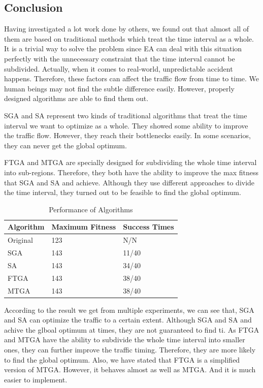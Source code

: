 \documentclass{article} %
\begin{document}
\subsection{Conclusion}
Having investigated a lot work done by others, we found out that almost all of them are based on traditional methods which treat the time interval as a whole. It is a trivial way to solve the problem since EA can deal with this situation perfectly with the unnecessary constraint that the time interval cannot be subdivided. Actually, when it comes to real-world, unpredictable accident happens. Therefore, these factors can affect the traffic flow from time to time. We human beings may not find the subtle difference easily. However, properly designed algorithms are able to find them out.

SGA and SA represent two kinds of traditional algorithms that treat the time interval we want to optimize as a whole. They showed some ability to improve the traffic flow. However, they reach their bottlenecks easily. In some scenarios, they can never get the global optimum. 

FTGA and MTGA are specially designed for subdividing the whole time interval into sub-regions. Therefore, they both have the ability to improve the max fitness that SGA and SA and achieve. Although they use different approaches to divide the time interval, they turned out to be feasible to find the global optimum. 

\begin{table}
\centering
\renewcommand\arraystretch{2.5}
    \begin{tabular}{|l|l|l|}
    \hline
    \textbf{Algorithm} & \textbf{Maximum Fitness} & \textbf{Success Times} \\ \hline
    Original  & 123             & N/N             \\ \hline
    SGA       & 143             & 11/40           \\ \hline
    SA        & 143             & 34/40           \\ \hline
    FTGA      & 143             & 38/40           \\ \hline
    MTGA      & 143             & 38/40           \\ \hline
    \end{tabular}
    \caption {Performance of Algorithms}
\end{table}

According to the result we get from multiple experiments, we can see that, SGA and SA can optimize the traffic to a certain extent. Although SGA and SA and achive the glboal optimum at times, they are not guaranteed to find ti. As FTGA and MTGA have the ability to subdivide the whole time interval into smaller ones, they can further improve the traffic timing. Therefore, they are more likely to find the global optimum. Also, we have stated that FTGA is a simplified version of MTGA. However, it behaves almost as well as MTGA. And it is much easier to implement.
\end{document}
